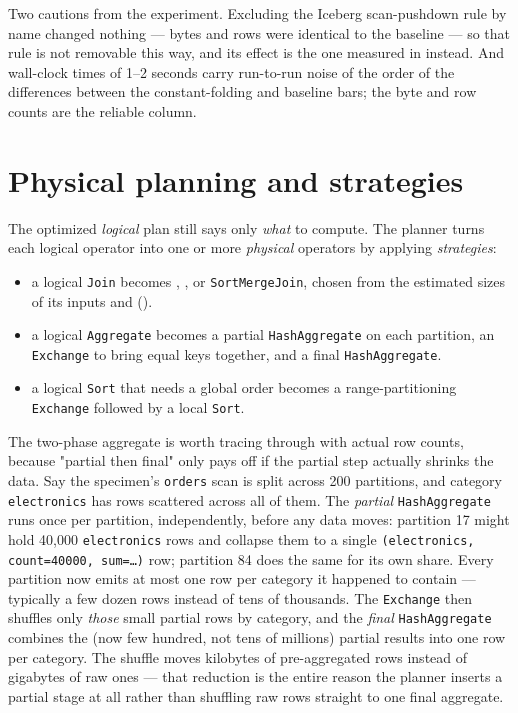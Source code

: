 Two cautions from the experiment. Excluding the Iceberg scan-pushdown rule by name
changed nothing --- bytes and rows were identical to the baseline --- so that rule
is not removable this way, and its effect is the one measured in
 instead. And wall-clock times of 1--2 seconds
carry run-to-run noise of the order of the differences between the
constant-folding and baseline bars; the byte and row counts are the reliable
column.

\section{Physical planning and strategies}
\label{sec:catalyst-physical}

The optimized \emph{logical} plan still says only \emph{what} to compute. The
planner turns each logical operator into one or more \emph{physical} operators by
applying \emph{strategies}:

\begin{itemize}
  \item a logical \texttt{Join} becomes ,
        , or \texttt{SortMergeJoin}, chosen from the
        estimated sizes of its inputs and 
        ().
  \item a logical \texttt{Aggregate} becomes a partial \texttt{HashAggregate} on
        each partition, an \texttt{Exchange} to bring equal keys together, and a
        final \texttt{HashAggregate}.
  \item a logical \texttt{Sort} that needs a global order becomes a
        range-partitioning \texttt{Exchange} followed by a local \texttt{Sort}.
\end{itemize}

The two-phase aggregate is worth tracing through with actual row counts,
because "partial then final" only pays off if the partial step actually
shrinks the data. Say the specimen's \texttt{orders} scan is split across 200
partitions, and category \texttt{electronics} has rows scattered across all
of them. The \emph{partial} \texttt{HashAggregate} runs once per partition,
independently, before any data moves: partition 17 might hold 40,000
\texttt{electronics} rows and collapse them to a single
\texttt{(electronics, count=40000, sum=\ldots)} row; partition 84 does the
same for its own share. Every partition now emits at most one row per
category it happened to contain --- typically a few dozen rows instead of
tens of thousands. The \texttt{Exchange} then shuffles only \emph{those}
small partial rows by category, and the \emph{final} \texttt{HashAggregate}
combines the (now few hundred, not tens of millions) partial results into
one row per category. The shuffle moves kilobytes of pre-aggregated rows
instead of gigabytes of raw ones --- that reduction is the entire reason the
planner inserts a partial stage at all rather than shuffling raw rows
straight to one final aggregate.

